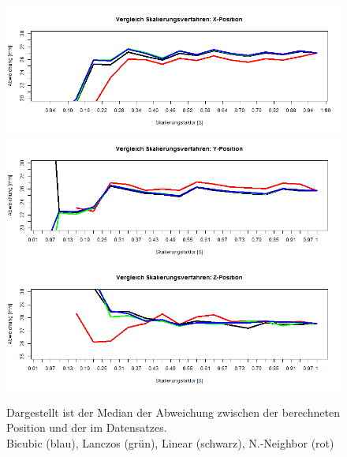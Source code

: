 \begin{figure}
	\centering
	\includegraphics[width=\linewidth]{img_Skalierung/Skal_Diff_TX}
	\includegraphics[width=\linewidth]{img_Skalierung/Skal_Diff_TY}
	\includegraphics[width=\linewidth]{img_Skalierung/Skal_Diff_TZ}
	\caption{Dargestellt ist der Median der Abweichung zwischen der berechneten Position und der im Datensatzes.\\
		Bicubic (blau), Lanczos (grün), Linear (schwarz), N.-Neighbor (rot)}
	\label{img_Pos_Dif}
\end{figure}
